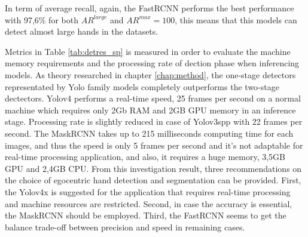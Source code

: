 In term of average recall, again, the FastRCNN performs the best performance with 97,6\% for both \(AR^{large}\) and \(AR^{max}=100\), this means that this models can detect almost large hands in the datasets.

Metrics in Table \ref{tab:detres_sp} is measured in order to evaluate the machine memory requirements and the processing rate of dection phase when inferencing models. As theory researched in chapter \ref{chap:method}, the one-stage detectors representated by Yolo family models completely outperforms the two-stage dectectors. Yolov4 performs a real-time speed, 25 frames per second on a normal machine which requires only 2Gb RAM and 2GB GPU memory in an inference stage. Processing rate is slightly reduced in case of Yolov3spp with 22 frames per second. The MaskRCNN takes up to 215 milliseconds computing time for each images, and thus the speed is only 5 frames per second and it’s not adaptable for real-time processing application, and also, it requires a huge memory, 3,5GB GPU and 2,4GB CPU.
From this investigation result, three recommendations on the choice of egocentric hand detection and segmentation can be provided. First, the Yolov4x is suggested for the application that requires real-time processing and machine resources are restricted. Second, in case the accuracy is essential, the MaskRCNN should be employed. Third, the FastRCNN seems to get the balance trade-off between precision and speed in remaining cases.

